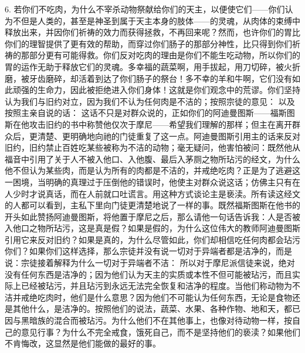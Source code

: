 6. 若你们不吃肉，为什么不宰杀动物祭献给你们的天主，以便使它们——你们认为不但是人类的，甚至是神圣到属于天主本身的肢体——的灵魂，从肉体的束缚中释放出来，并因你们祈祷的效力而获得拯救，不再回来呢？然而，也许你们的胃比你们的理智提供了更有效的帮助，而穿过你们肠子的那部分神性，比只得到你们祈祷的那部分更有可能得救。你们反对吃肉的理由是你们不能生吃动物，所以你们的胃的运作无助于释放它们的灵魂。多幸福的蔬菜啊，用手拔起，用刀切碎，被火折磨，被牙齿磨碎，却活着到达了你们肠子的祭台！多不幸的羊和牛啊，它们没有如此顽强的生命力，因此被拒绝进入你们身体！这就是你们观念中的荒谬。你们坚持认为我们与旧约对立，因为我们不认为任何肉是不洁的；按照宗徒的意见： 以及按照主亲自说的话： 这话不只是对群众说的，正如你们的阿迪曼图斯——福斯图斯在他攻击旧约的书中称赞他仅次于摩尼——希望我们理解的那样；但主在离开群众后，更清楚、更明确地向祂的门徒重复了这一点。阿迪曼图斯引用主的话来反对旧约，旧约禁止百姓吃某些被称为不洁的动物；毫无疑问，他害怕被问：既然他从福音中引用了关于人不被入他口、入他腹、最后入茅厕之物所玷污的经文，为什么他不但认为某些肉，而是认为所有的肉都是不洁的，并戒绝吃肉？正是为了逃避这一困境，当明确的真理过于压倒他的错误时，他使主对群众说这话；仿佛主只有在人少时才说真话，而在人前就口吐谎言。用这种方式谈论主是亵渎。所有读这经文的人都可以看到，主私下里向门徒更清楚地说了一样的事。既然福斯图斯在他书的开头如此赞扬阿迪曼图斯，将他置于摩尼之后，那么请他一句话告诉我：人是否被入他口之物所玷污，这是真是假？如果是假的，为什么这位伟大的教师阿迪曼图斯引用它来反对旧约？如果是真的，为什么尽管如此，你们却相信吃任何肉都会玷污你们？如果你们这样选择，那么宗徒并没有说一切对于异端者都是洁净的，而是说：宗徒接着解释为什么一切对于异端者不洁： 所以对于摩尼派信徒来说，绝对没有任何东西是洁净的；因为他们认为天主的实质或本性不但可能被玷污，而且实际上已经被玷污，并且玷污到永远无法完全恢复和洁净的程度。当他们称动物为不洁并戒绝吃肉时，他们是什么意思？因为他们不可能认为任何东西，无论是食物还是其他什么，是洁净的。按照他们的说法，蔬菜、水果、各种作物、地和天，都已因与黑暗族的混合而被玷污。为什么他们不在其他事上，也像对待动物一样，按自己的意见行事？为什么不完全戒食，饿死自己，而不是坚持他们的亵渎？如果他们不肯悔改，这显然是他们能做的最好的事。\par

